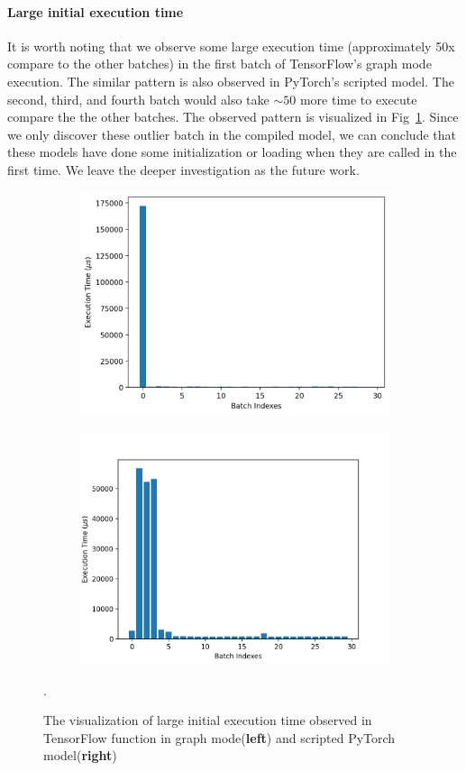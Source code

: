 \documentclass[12pt,twocolumn,letterpaper]{extarticle}
\begin{document}
\paragraph{Large initial execution time} It is worth noting that we observe some large execution time (approximately 50x compare to the other batches) in the first batch of TensorFlow's graph mode execution. The similar pattern is also observed in PyTorch's scripted model. The second, third, and fourth batch would also take $\sim 50$ more time to execute compare the the other batches. The observed pattern is visualized in Fig~\ref{fig:large-init}. Since we only discover these outlier batch in the compiled model, we can conclude that these models have done some initialization or loading when they are called in the first time. We leave the deeper investigation as the future work.

\begin{figure}[htbp]
  \centering
  \begin{subfigure}
    \centering
    \includegraphics[width=0.45\columnwidth]{images/tf-graph.png}
  \end{subfigure}
  \hfill
  \begin{subfigure}
    \centering
    \includegraphics[width=0.47\columnwidth]{images/pt-script.png}
  \end{subfigure}

  \caption{The visualization of large initial execution time observed in TensorFlow function in graph mode(\textbf{left}) and scripted PyTorch model(\textbf{right})}.
  \label{fig:large-init}
\end{figure}
\end{document}
